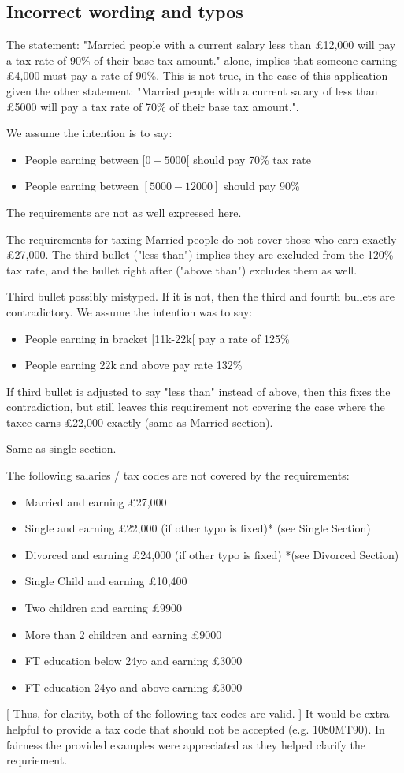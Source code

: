 \subsection{Incorrect wording and typos}
The statement: "Married people with a current salary less than £12,000 will pay a tax rate of 90\% of their base tax amount." alone, implies that someone earning £4,000 must pay a rate of 90\%. This is not true, in the case of this application given the other statement: "Married people with a current salary of less than £5000 will pay a tax rate of 70\% of their base tax amount.". 

We assume the intention is to say: 
\begin{itemize}
	\item People earning between $[0-5000[$ should pay 70\% tax rate 
	\item People earning between $[5000-12000]$ should pay 90\%
\end{itemize}

The requirements are not as well expressed here. 

The requirements for taxing Married people do not cover those who earn exactly £27,000. The third bullet ("less than") implies they are excluded from the 120\% tax rate, and the bullet right after ("above than") excludes them as well. 

Third bullet possibly mistyped. If it is not, then the third and fourth bullets are contradictory. We assume the intention was to say:  

\begin{itemize}
	\item People earning in bracket [11k-22k[ pay a rate of 125\%
	\item People earning 22k and above pay rate 132\%
\end{itemize}

If third bullet is adjusted to say "less than" instead of above, then this fixes the contradiction, but still leaves this requirement not covering the case where the taxee earns £22,000 exactly (same as Married section). 

Same as single section. 

The following salaries / tax codes are not covered by the requirements: 
\begin{itemize}
	\item Married and earning £27,000
	\item Single and earning £22,000 (if other typo is fixed)* (see Single Section)
	\item Divorced and earning £24,000 (if other typo is fixed) *(see Divorced Section)
	\item Single Child and earning £10,400
	\item Two children and earning £9900
	\item More than 2 children and earning £9000
	\item FT education below 24yo and earning £3000
	\item FT education 24yo and above earning £3000
\end{itemize}




[ Thus, for clarity, both of the following tax codes are valid. ] 
It would be extra helpful to provide a tax code that should not be accepted (e.g. 1080MT90). In fairness the provided examples were appreciated as they helped clarify the requriement.
